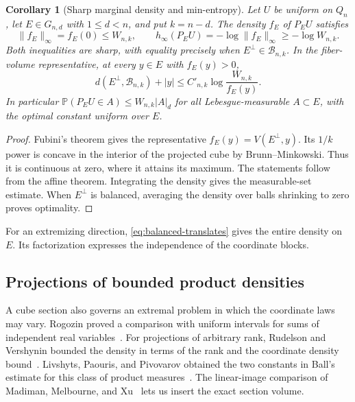 \documentclass[11pt,a4paper]{article}
\newtheorem{corollary}[theorem]{Corollary}
\theoremstyle{remark}\newtheorem{remark}[theorem]{Remark}
\numberwithin{equation}{section}
\begin{document}
\begin{corollary}[Sharp marginal density and min-entropy]\label{cor:projection-density}\label{cor:renyi-infinity}
Let \(U\) be uniform on \(Q_n\), let \(E\in G_{n,d}\) with \(1\le d<n\),
and put \(k=n-d\). The density \(f_E\) of \(P_EU\) satisfies
\[
 \|f_E\|_\infty=f_E(0)\le W_{n,k},\qquad
 h_\infty(P_EU)=-\log\|f_E\|_\infty\ge-\log W_{n,k}.
\]
Both inequalities are sharp, with equality precisely when
\(E^\perp\in\mathcal B_{n,k}\). In the fiber-volume representative,
at every \(y\in E\) with \(f_E(y)>0\),
\[
 d(E^\perp,\mathcal B_{n,k})+|y|\le
 C'_{n,k}\log\frac{W_{n,k}}{f_E(y)}.
\]
In particular \(\mathbb P(P_EU\in A)\le W_{n,k}|A|_d\) for all
Lebesgue-measurable \(A\subset E\), with the optimal constant uniform over \(E\).
\end{corollary}
\begin{proof}
Fubini's theorem gives the representative \(f_E(y)=V(E^\perp,y)\).
Its \(1/k\) power is concave in the interior of the projected cube by
Brunn--Minkowski. Thus it is continuous at zero, where it attains its
maximum. The statements follow from the affine theorem. Integrating the
density gives the measurable-set estimate. When \(E^\perp\) is balanced,
averaging the density over balls shrinking to zero proves optimality.
\end{proof}

For an extremizing direction, \eqref{eq:balanced-translates} gives
the entire density on \(E\). Its factorization expresses the independence
of the coordinate blocks.

\subsection{Projections of bounded product densities}

A cube section also governs an extremal problem in which the coordinate
laws may vary. Rogozin proved a comparison with uniform intervals for
sums of independent real variables~\cite{Rogozin1987}. For projections
of arbitrary rank, Rudelson and Vershynin bounded the density in terms
of the rank and the coordinate density bound~\cite{RV2015}. Livshyts,
Paouris, and Pivovarov obtained the two constants in Ball's estimate
for this class of product measures~\cite[Theorem~1.1]{LivshytsPaourisPivovarov2016}.
The linear-image comparison of Madiman, Melbourne, and
Xu~\cite[Theorem~1.4]{MMX2017} lets us insert the exact section volume.
\end{document}
